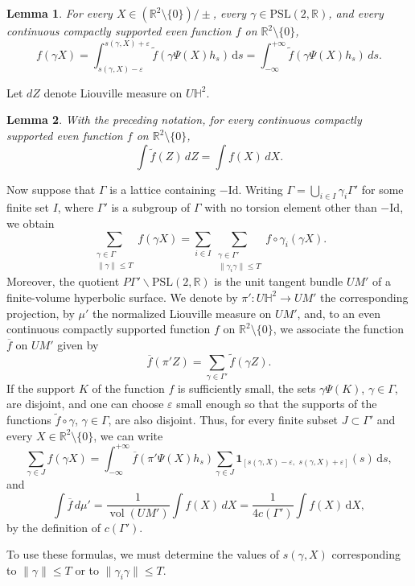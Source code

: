 \documentclass[11pt]{article}
\newtheorem{lemma}{Lemma}
\theoremstyle{remark}
\newcommand{\R}{\mathbb{R}}
\newcommand{\rd}{\mathrm{d}}
\newcommand{\PSL}{\mathrm{PSL}}
\newcommand{\Id}{\mathrm{Id}}
\newcommand{\vol}{\operatorname{vol}}
\begin{document}
\begin{lemma}
For every $X\in(\R^2\setminus\{0\})/\pm$, every $\gamma\in\PSL(2,\R)$, and every continuous compactly supported even function $f$ on $\R^2\setminus\{0\}$,
\[
f(\gamma X)=\int_{s(\gamma,X)-\varepsilon}^{s(\gamma,X)+\varepsilon}
\widetilde f(\gamma\Psi(X)h_s)\,\rd s
=\int_{-\infty}^{+\infty}\widetilde f(\gamma\Psi(X)h_s)\,ds.
\]
\end{lemma}

Let $dZ$ denote Liouville measure on $U\mathbb H^2$.

\begin{lemma}
With the preceding notation, for every continuous compactly supported even function $f$ on $\R^2\setminus\{0\}$,
\[
\int\widetilde f(Z)\,dZ=\int f(X)\,dX.
\]
\end{lemma}

Now suppose that $\Gamma$ is a lattice containing $-\Id$. Writing
$\Gamma=\bigcup_{i\in I}\gamma_i\Gamma'$ for some finite set $I$, where $\Gamma'$ is a subgroup of $\Gamma$ with no torsion element other than $-\Id$, we obtain
\[
\sum_{\substack{\gamma\in\Gamma\\ \|\gamma\|\le T}} f(\gamma X)
=\sum_{i\in I}\sum_{\substack{\gamma\in\Gamma'\\ \|\gamma_i\gamma\|\le T}} f\circ\gamma_i(\gamma X).
\]
Moreover, the quotient $P\Gamma'\backslash\PSL(2,\R)$ is the unit tangent bundle $UM'$ of a finite-volume hyperbolic surface. We denote by $\pi':U\mathbb H^2\to UM'$ the corresponding projection, by $\mu'$ the normalized Liouville measure on $UM'$, and, to an even continuous compactly supported function $f$ on $\R^2\setminus\{0\}$, we associate the function $\overline f$ on $UM'$ given by
\[
\overline f(\pi' Z)=\sum_{\gamma\in\Gamma'}\widetilde f(\gamma Z).
\]
If the support $K$ of the function $f$ is sufficiently small, the sets $\gamma\Psi(K)$, $\gamma\in\Gamma$, are disjoint, and one can choose $\varepsilon$ small enough so that the supports of the functions $\widetilde f\circ\gamma$, $\gamma\in\Gamma$, are also disjoint. Thus, for every finite subset $J\subset\Gamma'$ and every $X\in\R^2\setminus\{0\}$, we can write
\[
\sum_{\gamma\in J}f(\gamma X)
=\int_{-\infty}^{+\infty}\overline f(\pi'\Psi(X)h_s)
\sum_{\gamma\in J}\mathbf 1_{[s(\gamma,X)-\varepsilon,\, \,s(\gamma,X)+\varepsilon]}(s)\,\rd s,
\]
and
\[
\int \overline f\,d\mu'
=\frac{1}{\vol(UM')}\int f(X)\,dX
=\frac{1}{4c(\Gamma')}\int f(X)\,\rd X,
\]
by the definition of $c(\Gamma')$.

To use these formulas, we must determine the values of $s(\gamma,X)$ corresponding to $\|\gamma\|\le T$ or to $\|\gamma_i\gamma\|\le T$.
\end{document}
